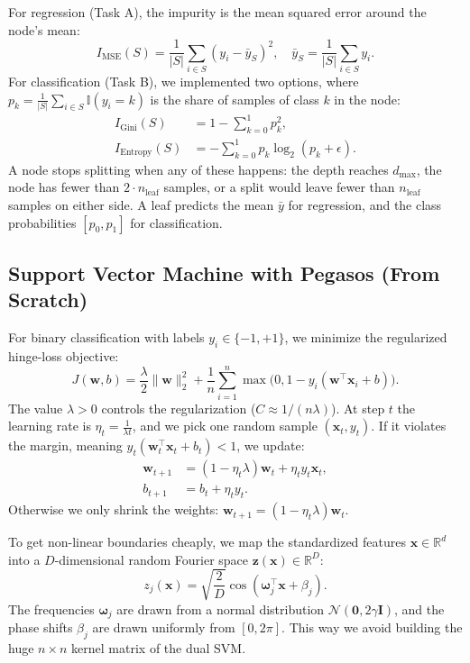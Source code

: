 \documentclass[10pt,twocolumn,a4paper]{article}
\begin{document}
  For regression (Task A), the impurity is the mean squared error around the node's mean:
  \begin{equation}
    I_{\text{MSE}}(S) = \frac{1}{|S|}\sum_{i \in S} (y_i - \bar{y}_S)^2, \quad \bar{y}_S = \frac{1}{|S|}\sum_{i \in S} y_i.
  \end{equation}
  For classification (Task B), we implemented two options, where $p_k = \frac{1}{|S|}\sum_{i \in S} \mathbb{I}(y_i = k)$ is the share of samples of class $k$ in the node:
  \begin{align}
    I_{\text{Gini}}(S) &= 1 - \sum_{k=0}^{1} p_k^2, \\
    I_{\text{Entropy}}(S) &= - \sum_{k=0}^{1} p_k \log_2(p_k + \epsilon).
  \end{align}
  A node stops splitting when any of these happens: the depth reaches $d_{\max}$, the node has fewer than $2 \cdot n_{\text{leaf}}$ samples, or a split would leave fewer than $n_{\text{leaf}}$ samples on either side. A leaf predicts the mean $\bar{y}$ for regression, and the class probabilities $[p_0, p_1]$ for classification.

  \subsection{Support Vector Machine with Pegasos (From Scratch)}
  For binary classification with labels $y_i \in \{-1, +1\}$, we minimize the regularized hinge-loss objective:
  \begin{equation}
    J(\mathbf{w}, b) = \frac{\lambda}{2} \|\mathbf{w}\|_2^2 + \frac{1}{n}\sum_{i=1}^{n} \max\big(0, 1 - y_i(\mathbf{w}^\top \mathbf{x}_i + b)\big).
  \end{equation}
  The value $\lambda > 0$ controls the regularization ($C \approx 1/(n\lambda)$). At step $t$ the learning rate is $\eta_t = \frac{1}{\lambda t}$, and we pick one random sample $(\mathbf{x}_t, y_t)$. If it violates the margin, meaning $y_t(\mathbf{w}_t^\top \mathbf{x}_t + b_t) < 1$, we update:
  \begin{align}
    \mathbf{w}_{t+1} &= (1 - \eta_t \lambda)\mathbf{w}_t + \eta_t y_t \mathbf{x}_t, \\
    b_{t+1} &= b_t + \eta_t y_t.
  \end{align}
  Otherwise we only shrink the weights: $\mathbf{w}_{t+1} = (1 - \eta_t \lambda)\mathbf{w}_t$.

  To get non-linear boundaries cheaply, we map the standardized features $\mathbf{x} \in \mathbb{R}^d$ into a $D$-dimensional random Fourier space $\mathbf{z}(\mathbf{x}) \in \mathbb{R}^D$:
  \begin{equation}
    z_j(\mathbf{x}) = \sqrt{\frac{2}{D}} \cos(\mathbf{\omega}_j^\top \mathbf{x} + \beta_j).
  \end{equation}
  The frequencies $\mathbf{\omega}_j$ are drawn from a normal distribution $\mathcal{N}(\mathbf{0}, 2\gamma \mathbf{I})$, and the phase shifts $\beta_j$ are drawn uniformly from $[0, 2\pi]$. This way we avoid building the huge $n \times n$ kernel matrix of the dual SVM.
\end{document}
